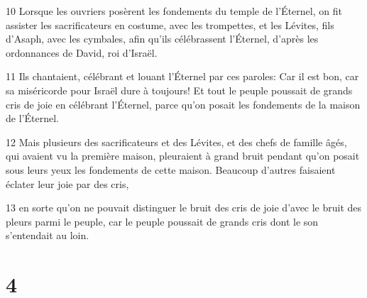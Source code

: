 \par 10 Lorsque les ouvriers posèrent les fondements du temple de l'Éternel, on fit assister les sacrificateurs en costume, avec les trompettes, et les Lévites, fils d'Asaph, avec les cymbales, afin qu'ils célébrassent l'Éternel, d'après les ordonnances de David, roi d'Israël.
\par 11 Ils chantaient, célébrant et louant l'Éternel par ces paroles: Car il est bon, car sa miséricorde pour Israël dure à toujours! Et tout le peuple poussait de grands cris de joie en célébrant l'Éternel, parce qu'on posait les fondements de la maison de l'Éternel.
\par 12 Mais plusieurs des sacrificateurs et des Lévites, et des chefs de famille âgés, qui avaient vu la première maison, pleuraient à grand bruit pendant qu'on posait sous leurs yeux les fondements de cette maison. Beaucoup d'autres faisaient éclater leur joie par des cris,
\par 13 en sorte qu'on ne pouvait distinguer le bruit des cris de joie d'avec le bruit des pleurs parmi le peuple, car le peuple poussait de grands cris dont le son s'entendait au loin.

\chapter{4}

